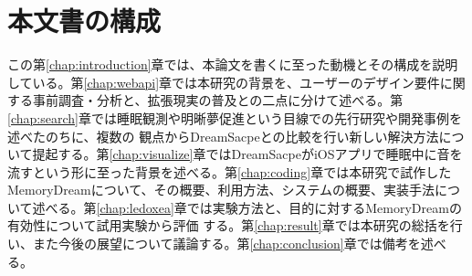 
\section{本文書の構成}
この第\ref{chap:introduction}章では、本論文を書くに至った動機とその構成を説明している。第\ref{chap:webapi}章では本研究の背景を、ユーザーのデザイン要件に関する事前調査・分析と、拡張現実の普及との二点に分けて述べる。第\ref{chap:search}章では睡眠観測や明晰夢促進という目線での先行研究や開発事例を述べたのちに、複数の 観点からDreamSacpeとの比較を行い新しい解決方法について提起する。第\ref{chap:visualize}章ではDreamSacpeがiOSアプリで睡眠中に音を流すという形に至った背景を述べる。第\ref{chap:coding}章では本研究で試作した MemoryDreamについて、その概要、利用方法、システムの概要、実装手法について述べる。第\ref{chap:ledoxea}章では実験方法と、目的に対するMemoryDreamの有効性について試用実験から評価 する。第\ref{chap:result}章では本研究の総括を行い、また今後の展望について議論する。第\ref{chap:conclusion}章では備考を述べる。

